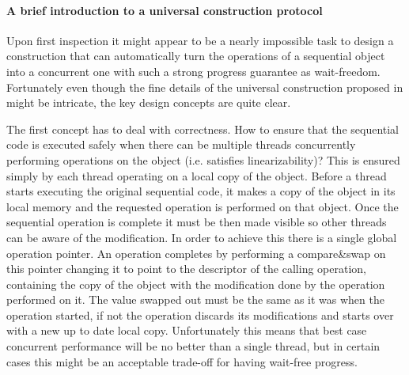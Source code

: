 %
%


\paragraph{A brief introduction to a universal construction protocol}
Upon first inspection it might appear to be a nearly impossible task to design
a construction that can automatically turn the operations of a sequential
object into a concurrent one with such a strong progress guarantee as wait-freedom.
Fortunately even though the fine details of the universal construction proposed
in \cite{H91} might be intricate, the key design concepts are quite clear.

The first concept has to deal with correctness.
How to ensure that the sequential code is executed safely when there
can be multiple threads concurrently performing operations on the object
(i.e. satisfies linearizability)?
This is ensured simply by each thread operating on a local copy of the object.
Before a thread starts executing the original sequential code, it makes a copy
of the object in its local memory and the requested operation is performed on that object.
Once the sequential operation is complete it must be then made visible so other
threads can be aware of the modification.
In order to achieve this there is a single global operation pointer.
An operation completes by performing a compare\&swap on this pointer
changing it to point to the descriptor of the calling operation, containing
the copy of the object with the modification done by the operation
performed on it.
The value swapped out must be the same as it was when the operation started,
if not the operation discards its modifications and starts over with a
new up to date local copy.
Unfortunately this means that best case concurrent performance will be no better
than a single thread, but in certain cases this might be an acceptable
trade-off for having wait-free progress.

